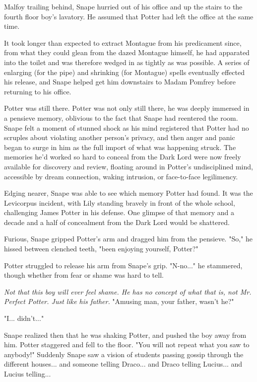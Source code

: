 Malfoy trailing behind, Snape hurried out of his office and up the stairs to the fourth floor boy's lavatory. He assumed that Potter had left the office at the same time.

It took longer than expected to extract Montague from his predicament since, from what they could glean from the dazed Montague himself, he had apparated into the toilet and was therefore wedged in as tightly as was possible. A series of enlarging (for the pipe) and shrinking (for Montague) spells eventually effected his release, and Snape helped get him downstairs to Madam Pomfrey before returning to his office.

Potter was still there. Potter was not only still there, he was deeply immersed in a pensieve memory, oblivious to the fact that Snape had reentered the room. Snape felt a moment of stunned shock as his mind registered that Potter had no scruples about violating another person's privacy, and then anger and panic began to surge in him as the full import of what was happening struck. The memories he'd worked so hard to conceal from the Dark Lord were now freely available for discovery and review, floating around in Potter's undisciplined mind, accessible by dream connection, waking intrusion, or face-to-face legilimency.

Edging nearer, Snape was able to see which memory Potter had found. It was the Levicorpus incident, with Lily standing bravely in front of the whole school, challenging James Potter in his defense. One glimpse of that memory and a decade and a half of concealment from the Dark Lord would be shattered.

Furious, Snape gripped Potter's arm and dragged him from the pensieve. "So," he hissed between clenched teeth, "been enjoying yourself, Potter?"

Potter struggled to release his arm from Snape's grip. "N-no..." he stammered, though whether from fear or shame was hard to tell.

\emph{Not that this boy will ever feel shame. He has no concept of what that is, not Mr. Perfect Potter. Just like his father.} "Amusing man, your father, wasn't he?"

"I... didn't..."

Snape realized then that he was shaking Potter, and pushed the boy away from him. Potter staggered and fell to the floor. "You will not repeat what you saw to anybody!" Suddenly Snape saw a vision of students passing gossip through the different houses... and someone telling Draco... and Draco telling Lucius... and Lucius telling...


